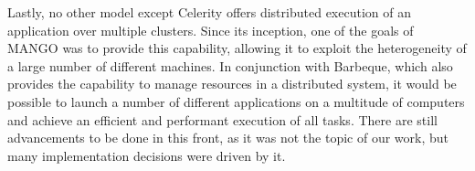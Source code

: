 Lastly, no other model except Celerity offers distributed execution of an application over multiple clusters. Since its inception, one of the goals of MANGO was to provide this capability, allowing it to exploit the heterogeneity of a large number of different machines. In conjunction with Barbeque, which also provides the capability to manage resources in a distributed system, it would be possible to launch a number of different applications on a multitude of computers and achieve an efficient and performant execution of all tasks. There are still advancements to be done in this front, as it was not the topic of our work, but many implementation decisions were driven by it.